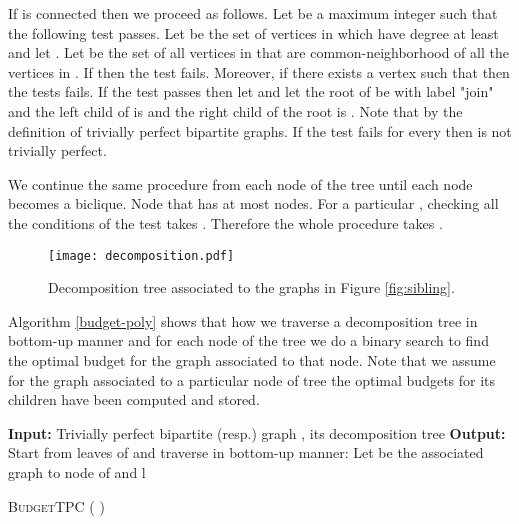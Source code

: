 \documentclass[letterpaper,11pt,abstracton]{scrartcl}
\newcommand{\qed}{\hfill}
\begin{document}
If  is connected then we proceed as follows.
Let  be a maximum integer such that the following test passes.
Let  be the set of vertices in  which have degree at least  and let . Let  be the set of all vertices in 
that are common-neighborhood of all the vertices in . If  then the test fails. Moreover, if there exists a vertex  such that  then
the tests fails. If the test passes then let  and let the root of  be  with label "join" and the
left child of  is  and the
right child of the root is . Note that by the definition of trivially perfect bipartite graphs.
If the test fails for every  then  is not trivially perfect.

We continue the same procedure from each node of the tree until  each node becomes a biclique. Node that  has at most  nodes. For a particular , checking all the conditions of the test takes
. Therefore the whole procedure takes .
 \qed \\

\begin{figure}[htbp]
 \begin{center}
\texttt{[image: decomposition.pdf]}
\caption{
Decomposition tree associated to the graphs in Figure \ref{fig:sibling}.
}
    \label{fig:decomposition}
  \end{center}
 \end{figure}



Algorithm \ref{budget-poly} shows that how we traverse a decomposition tree in bottom-up manner and for each node of the tree we do a binary search to find the optimal budget for the graph associated to that node. Note that we assume for the graph associated to a particular node of tree the optimal budgets for its children have been computed and stored.
\begin{algorithm}[H]
\begin{algorithmic}[1]
\State \textbf{Input:} Trivially perfect bipartite (resp.) graph , its decomposition tree \;
\State \textbf{Output:} \;
\State Start from leaves of  and traverse  in bottom-up manner:\;
\State Let  be the associated graph to node  of \;
\State{}
\State  and 
\While{  }
    	\State  \;
        \Else
        	\State 
    \EndIf
\EndWhile
\Return l\;
\end{algorithmic}
\caption{{\textsc{BudgetTPC}} ( )}
\label{budget-poly}
\end{algorithm}
\end{document}
